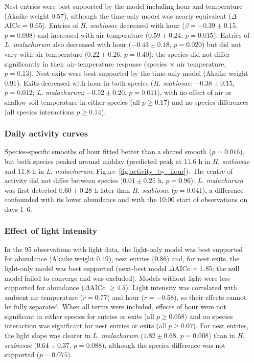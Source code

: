 \documentclass[11pt,a4paper]{article}
\begin{document}
Nest entries were best supported by the model including hour and temperature (Akaike weight 0.57), although the time-only model was nearly equivalent ($\Delta$AICc = 0.65). Entries of \textit{H. scabiosae} decreased with hour ($\beta = -0.39 \pm 0.15$, $p = 0.008$) and increased with air temperature ($0.59 \pm 0.24$, $p = 0.015$). Entries of \textit{L. malachurum} also decreased with hour ($-0.43 \pm 0.18$, $p = 0.020$) but did not vary with air temperature ($0.22 \pm 0.26$, $p = 0.40$); the species did not differ significantly in their air-temperature response (species $\times$ air temperature, $p = 0.13$). Nest exits were best supported by the time-only model (Akaike weight 0.91). Exits decreased with hour in both species (\textit{H. scabiosae}: $-0.38 \pm 0.15$, $p = 0.012$; \textit{L. malachurum}: $-0.52 \pm 0.20$, $p = 0.011$), with no effect of air or shallow soil temperature in either species (all $p \geq 0.17$) and no species differences (all species interactions $p \geq 0.14$).

\subsubsection{Daily activity curves}

Species-specific smooths of hour fitted better than a shared smooth ($p = 0.016$), but both species peaked around midday (predicted peak at 11.6 h in \textit{H. scabiosae} and 11.8 h in \textit{L. malachurum}; Figure~\ref{fig:activity_by_hour}). The centre of activity did not differ between species ($0.01 \pm 0.25$ h, $p = 0.96$). \textit{L. malachurum} was first detected $0.60 \pm 0.28$ h later than \textit{H. scabiosae} ($p = 0.041$), a difference confounded with its lower abundance and with the 10:00 start of observations on days 1--6.

\subsubsection{Effect of light intensity}

In the 95 observations with light data, the light-only model was best supported for abundance (Akaike weight 0.49), nest entries (0.86) and, for nest exits, the light-only model was best supported (next-best model $\Delta$AICc = 1.85; the null model failed to converge and was excluded). Models without light were less supported for abundance ($\Delta$AICc $\geq 4.5$). Light intensity was correlated with ambient air temperature ($r = 0.77$) and hour ($r = -0.58$), so their effects cannot be fully separated. When all terms were included, effects of hour were not significant in either species for entries or exits (all $p \geq 0.058$) and no species interaction was significant for nest entries or exits (all $p \geq 0.07$). For nest entries, the light slope was clearer in \textit{L. malachurum} ($1.82 \pm 0.68$, $p = 0.008$) than in \textit{H. scabiosae} ($0.64 \pm 0.37$, $p = 0.088$), although the species difference was not supported ($p = 0.075$).
\end{document}
